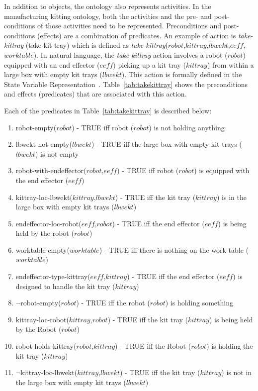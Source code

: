 \documentclass[preprint,12pt]{elsarticle}
\newcommand{\const}[1] {$\mathit{#1}$}
\newcommand{\stvar}[1] {\textsf{#1}}
\newcommand{\op}[1] {\textsl{#1}}
\begin{document}
In addition to objects, the ontology also represents activities. In the manufacturing kitting ontology, both the activities and the pre- and post-conditions of those activities need to be represented. Preconditions and post-conditions (effects) are a combination of predicates. An example of action is \op{take-kittray} (take kit tray) which is defined as \op{take-kittray}(\const{robot},\const{kittray},\const{lbwekt},\const{eeff},\const{worktable}). In natural language, the \op{take-kittray} action involves a robot (\const{robot}) equipped with an end effector (\const{eeff}) picking up a kit tray (\const{kittray}) from within a large box with empty kit trays (\const{lbwekt}). This action is formally defined in the State Variable Representation~\cite{NAU.2004}. Table~\ref{tab:takekittray} shows the preconditions and effects (predicates) that are associated with this action.



Each of the predicates in Table~\ref{tab:takekittray} is described below:
\begin{enumerate}
\item \stvar{robot-empty}(\const{robot}) - TRUE iff robot (\const{robot}) is not holding anything
\item \stvar{lbwekt-not-empty}(\const{lbwekt}) - TRUE iff the large box with empty kit trays (\const{lbwekt}) is not empty
\item \stvar{robot-with-endeffector}(\const{robot},\const{eeff}) - TRUE iff robot (\const{robot}) is equipped with the end effector (\const{eeff})
\item \stvar{kittray-loc-lbwekt}(\const{kittray},\const{lbwekt}) - TRUE iff the kit tray (\const{kittray}) is in the large box with empty kit trays (\const{lbwekt})
\item \stvar{endeffector-loc-robot}(\const{eeff},\const{robot}) - TRUE iff the end effector (\const{eeff}) is being held by the robot (\const{robot})
\item \stvar{worktable-empty}(\const{worktable}) - TRUE iff there is nothing on the work table (\const{worktable})
\item \stvar{endeffector-type-kittray}(\const{eeff},\const{kittray}) - TRUE iff the end effector (\const{eeff}) is designed to handle the kit tray (\const{kittray})
\item $\neg$\stvar{robot-empty}(\const{robot}) - TRUE iff the robot (\const{robot}) is holding something
\item \stvar{kittray-loc-robot}(\const{kittray},\const{robot}) - TRUE iff the kit tray (\const{kittray}) is being held by the Robot (\const{robot})
\item \stvar{robot-holds-kittray}(\const{robot},\const{kittray}) - TRUE iff the Robot (\const{robot}) is holding the kit tray (\const{kittray})
\item $\neg$\stvar{kittray-loc-lbwekt}(\const{kittray},\const{lbwekt}) - TRUE iff the kit tray (\const{kittray}) is not in the large box with empty kit trays (\const{lbwekt})
\end{enumerate}
\end{document}
